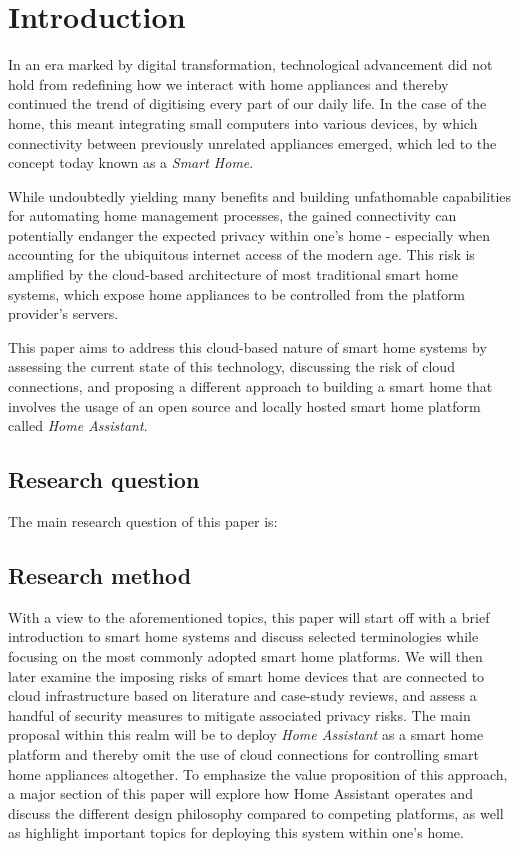 

\section{Introduction}

In an era marked by digital transformation, technological advancement did not hold from redefining how we interact with home appliances and thereby continued the trend of digitising every part of our daily life. In the case of the home, this meant integrating small computers into various devices, by which connectivity between previously unrelated appliances emerged, which led to the concept today known as a \textit{Smart Home}.

While undoubtedly yielding many benefits and building unfathomable capabilities for automating home management processes, the gained connectivity can potentially endanger the expected privacy within one's home - especially when accounting for the ubiquitous internet access of the modern age. This risk is amplified by the cloud-based architecture of most traditional smart home systems, which expose home appliances to be controlled from the platform provider's servers. 

This paper aims to address this cloud-based nature of smart home systems by assessing the current state of this technology, discussing the risk of cloud connections, and proposing a different approach to building a smart home that involves the usage of an open source and locally hosted smart home platform called \textit{Home Assistant}.


\subsection{Research question}
The main research question of this paper is:


\subsection{Research method}
With a view to the aforementioned topics, this paper will start off with a brief introduction to smart home systems and discuss selected terminologies while focusing on the most commonly adopted smart home platforms. We will then later examine the imposing risks of smart home devices that are connected to cloud infrastructure based on literature and case-study reviews, and assess a handful of security measures to mitigate associated privacy risks. The main proposal within this realm will be to deploy \textit{Home Assistant} as a smart home platform and thereby omit the use of cloud connections for controlling smart home appliances altogether. To emphasize the value proposition of this approach, a major section of this paper will explore how Home Assistant operates and discuss the different design philosophy compared to competing platforms, as well as highlight important topics for deploying this system within one's home. 

